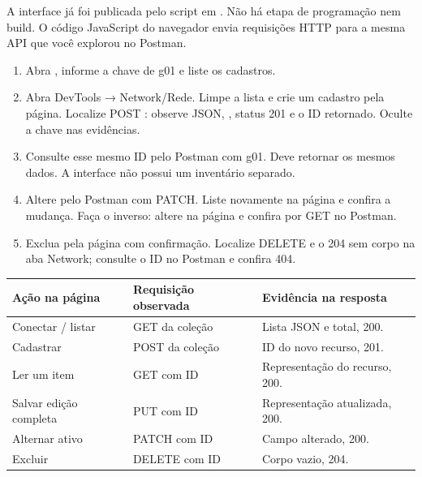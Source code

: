 A interface já foi publicada pelo script em . Não há etapa de programação nem build. O código JavaScript do navegador envia requisições HTTP para a mesma API que você explorou no Postman.

\begin{enumerate}
\item Abra , informe a chave de g01 e liste os cadastros.
\item Abra DevTools → Network/Rede. Limpe a lista e crie um cadastro pela página. Localize POST : observe JSON, , status 201 e o ID retornado. Oculte a chave nas evidências.
\item Consulte esse mesmo ID pelo Postman com g01. Deve retornar os mesmos dados. A interface não possui um inventário separado.
\item Altere  pelo Postman com PATCH. Liste novamente na página e confira a mudança. Faça o inverso: altere na página e confira por GET no Postman.
\item Exclua pela página com confirmação. Localize DELETE e o 204 sem corpo na aba Network; consulte o ID no Postman e confira 404.
\end{enumerate}

\begin{tabularx}{\linewidth}{@{}lYY@{}}\toprule
Ação na página & Requisição observada & Evidência na resposta \\\midrule
Conectar / listar & GET da coleção & Lista JSON e total, 200.\\
Cadastrar & POST da coleção & ID do novo recurso, 201.\\
Ler um item & GET com ID & Representação do recurso, 200.\\
Salvar edição completa & PUT com ID & Representação atualizada, 200.\\
Alternar ativo & PATCH com ID & Campo alterado, 200.\\
Excluir & DELETE com ID & Corpo vazio, 204.\\\bottomrule
\end{tabularx}



